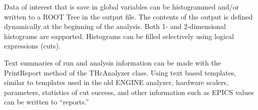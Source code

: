 {{Data of interest that is save in global variables
can be histogrammed and/or written to
a ROOT Tree in the output file.  The contents of the output
is defined dynamically at the beginning of the analysis.
Both 1- and 2-dimensional histograms are supported. Histograms
can be filled selectively using logical expressions (cuts).

Text summaries of run and analysis information can be made with the
PrintReport method of the THcAnalyzer class.  Using text based
templates, similar to templates used in the old ENGINE analyzer,
hardware scalers, parameters, statistics of cut success, and other
information such as EPICS values can be written to ``reports.''

} %

}
